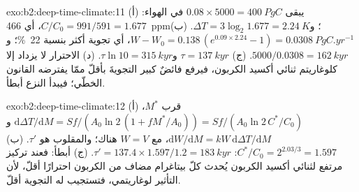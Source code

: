 \begin{solution}{exo:b2:deep-time-climate:11}
(أ) يبقى $0.08\times5000 = \qty{400}{PgC}$ في الهواء: $C/C_0 = 991/591 = 1.677$، أي
\qty{466}{ppm}؛ و$\Delta T = 3\log_2 1.677 = \qty{2.24}{K}$. (ب) $W - W_0 = 0.138\,(e^{0.09\times2.24}
- 1) = \qty{0.0308}{PgC.yr^{-1}}$، أي تجوية أكثر بنسبة \qty{22}{\percent}؛ و$5000/0.0308 =
\qty{162}{kyr}$. (ج) $\tau = \qty{137}{kyr}$ و$\tau\ln10 = \qty{315}{kyr}$. (د) الاحترار لا يزداد
إلا كلوغاريتم ثنائي أكسيد الكربون، فيرفع فائضٌ كبير التجويةَ بأقلّ ممّا يفترضه
القانون الخطّي؛ فيبدأ النزع أبطأ.
\end{solution}

\begin{solution}{exo:b2:deep-time-climate:12}
(أ) قرب $M^*$، $\mathrm d\Delta T/\mathrm dM = Sf/(A_0\ln 2\,(1 + fM^*/A_0)) = Sf/(A_0\ln 2\,
C^*/C_0)$ و$\mathrm dW/\mathrm dM = kW\,\mathrm d\Delta T/\mathrm dM$، مع $W = V$ هناك؛
والمقلوب هو $\tau'$. (ب) $C^*/C_0 = 2^{2.03/3} = 1.597$: $\tau' = 137.4\times1.597/1.2 =
\qty{183}{kyr}$. (ج) أبطأ: فعند تركيز مرتفع لثنائي أكسيد الكربون يُحدث كلّ بيتاغرام مضاف من الكربون احترارًا أقلّ،
لأن التأثير لوغاريتمي، فتستجيب له التجوية أقلّ.
\end{solution}

